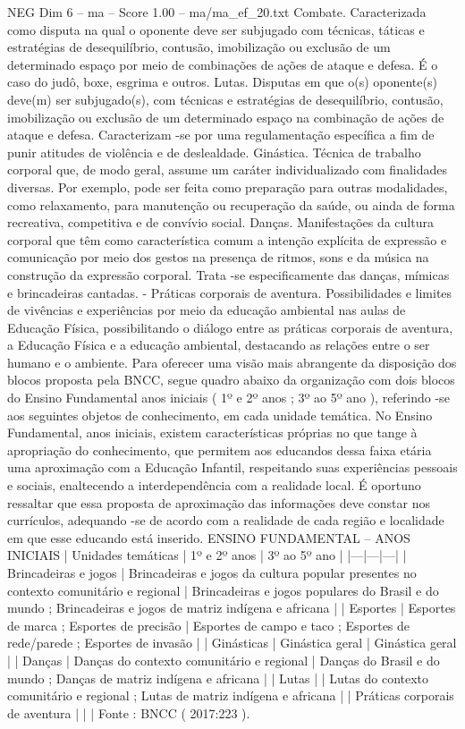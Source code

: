 \begin{textsample}{NEG Dim 6 – ma – Score 1.00 – ma/ma\_ef\_20.txt}
Combate.
Caracterizada como disputa na qual o oponente deve ser subjugado com técnicas, táticas e estratégias de desequilíbrio, contusão, imobilização ou exclusão de um determinado espaço por meio de combinações de ações de ataque e defesa.
É o caso do judô, boxe, esgrima e outros.
Lutas.
Disputas em que o(s) oponente(s) deve(m) ser subjugado(s), com técnicas e estratégias de desequilíbrio, contusão, imobilização ou exclusão de um determinado espaço na combinação de ações de ataque e defesa.
Caracterizam -se por uma regulamentação específica a fim de punir atitudes de violência e de deslealdade.
Ginástica.
Técnica de trabalho corporal que, de modo geral, assume um caráter individualizado com finalidades diversas.
Por exemplo, pode ser feita como preparação para outras modalidades, como relaxamento, para manutenção ou recuperação da saúde, ou ainda de forma recreativa, competitiva e de convívio social.
Danças.
Manifestações da cultura corporal que têm como característica comum a intenção explícita de expressão e comunicação por meio dos gestos na presença de ritmos, sons e da música na construção da expressão corporal.
Trata -se especificamente das danças, mímicas e brincadeiras cantadas. - Práticas corporais de aventura.
Possibilidades e limites de vivências e experiências por meio da educação ambiental nas aulas de Educação Física, possibilitando o diálogo entre as práticas corporais de aventura, a Educação Física e a educação ambiental, destacando as relações entre o ser humano e o ambiente.
Para oferecer uma visão mais abrangente da disposição dos blocos proposta pela BNCC, segue quadro abaixo da organização com dois blocos do Ensino Fundamental anos iniciais ( 1º e 2º anos ; 3º ao 5º ano ), referindo -se aos seguintes objetos de conhecimento, em cada unidade temática.
No Ensino Fundamental, anos iniciais, existem características próprias no que tange à apropriação do conhecimento, que permitem aos educandos dessa faixa etária uma aproximação com a Educação Infantil, respeitando suas experiências pessoais e sociais, enaltecendo a interdependência com a realidade local.
É oportuno ressaltar que essa proposta de aproximação das informações deve constar nos currículos, adequando -se de acordo com a realidade de cada região e localidade em que esse educando está inserido.
ENSINO FUNDAMENTAL – ANOS INICIAIS | Unidades temáticas | 1º e 2º anos | 3º ao 5º ano | |---|---|---| | Brincadeiras e jogos | Brincadeiras e jogos da cultura popular presentes no contexto comunitário e regional | Brincadeiras e jogos populares do Brasil e do mundo ; Brincadeiras e jogos de matriz indígena e africana | | Esportes | Esportes de marca ; Esportes de precisão | Esportes de campo e taco ; Esportes de rede/parede ; Esportes de invasão | | Ginásticas | Ginástica geral | Ginástica geral | | Danças | Danças do contexto comunitário e regional | Danças do Brasil e do mundo ; Danças de matriz indígena e africana | | Lutas | | Lutas do contexto comunitário e regional ; Lutas de matriz indígena e africana | | Práticas corporais de aventura | | | Fonte : BNCC ( 2017:223 ).

\end{textsample}
